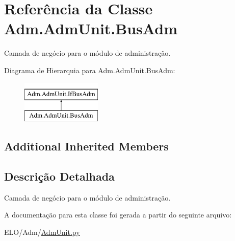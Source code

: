 \hypertarget{classAdm_1_1AdmUnit_1_1BusAdm}{\section{Referência da Classe Adm.\-Adm\-Unit.\-Bus\-Adm}
\label{classAdm_1_1AdmUnit_1_1BusAdm}
}


Camada de negócio para o módulo de administração.  


Diagrama de Hierarquia para Adm.\-Adm\-Unit.\-Bus\-Adm\-:\begin{figure}[H]
\begin{center}
\leavevmode
\includegraphics[height=2.000000cm]{de/de0/classAdm_1_1AdmUnit_1_1BusAdm}
\end{center}
\end{figure}
\subsection*{Additional Inherited Members}


\subsection{Descrição Detalhada}
Camada de negócio para o módulo de administração. 



A documentação para esta classe foi gerada a partir do seguinte arquivo\-:\begin{DoxyCompactItemize}
\item 
E\-L\-O/\-Adm/\hyperlink{AdmUnit_8py}{Adm\-Unit.\-py}\end{DoxyCompactItemize}
